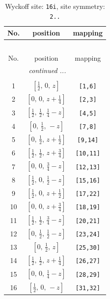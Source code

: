 \documentclass[fleqn,8pt]{jsarticle}
\begin{document}
\renewcommand{\arraystretch}{1.2}
\begin{longtable}{ccc}
\caption{Wyckoff site: {\tt 16i}, site symmetry: {\tt 2..}}
 \\
 \hline \hline
No. & position & mapping \\ \hline \endfirsthead

\multicolumn{2}{l}{\tablename\ \thetable{}} \\
 \hline \hline
No. & position & mapping \\ \hline \endhead

 \hline \hline
\multicolumn{2}{r}{\footnotesize\it continued ...} \\ \endfoot

 \hline \hline
\multicolumn{2}{r}{} \\ \endlastfoot

1 & $\left[ \frac{1}{2},\, 0,\, z \right]$ & {\tt [1,6]} \\ \hline
2 & $\left[ 0,\, 0,\, z + \frac{1}{4} \right]$ & {\tt [2,3]} \\ \hline
3 & $\left[ \frac{1}{2},\, \frac{1}{2},\, \frac{1}{4} - z \right]$ & {\tt [4,5]} \\ \hline
4 & $\left[ 0,\, \frac{1}{2},\, - z \right]$ & {\tt [7,8]} \\ \hline
5 & $\left[ 0,\, \frac{1}{2},\, z + \frac{1}{2} \right]$ & {\tt [9,14]} \\ \hline
6 & $\left[ \frac{1}{2},\, \frac{1}{2},\, z + \frac{3}{4} \right]$ & {\tt [10,11]} \\ \hline
7 & $\left[ 0,\, 0,\, \frac{3}{4} - z \right]$ & {\tt [12,13]} \\ \hline
8 & $\left[ \frac{1}{2},\, 0,\, \frac{1}{2} - z \right]$ & {\tt [15,16]} \\ \hline
9 & $\left[ \frac{1}{2},\, 0,\, z + \frac{1}{2} \right]$ & {\tt [17,22]} \\ \hline
10 & $\left[ 0,\, 0,\, z + \frac{3}{4} \right]$ & {\tt [18,19]} \\ \hline
11 & $\left[ \frac{1}{2},\, \frac{1}{2},\, \frac{3}{4} - z \right]$ & {\tt [20,21]} \\ \hline
12 & $\left[ 0,\, \frac{1}{2},\, \frac{1}{2} - z \right]$ & {\tt [23,24]} \\ \hline
13 & $\left[ 0,\, \frac{1}{2},\, z \right]$ & {\tt [25,30]} \\ \hline
14 & $\left[ \frac{1}{2},\, \frac{1}{2},\, z + \frac{1}{4} \right]$ & {\tt [26,27]} \\ \hline
15 & $\left[ 0,\, 0,\, \frac{1}{4} - z \right]$ & {\tt [28,29]} \\ \hline
16 & $\left[ \frac{1}{2},\, 0,\, - z \right]$ & {\tt [31,32]} \\
\end{longtable}
\end{document}
